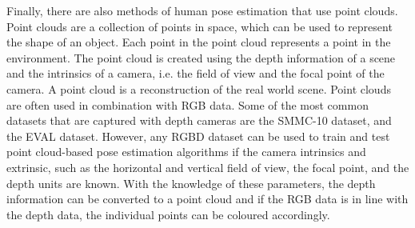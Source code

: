Finally, there are also methods of human pose estimation that use point clouds. Point clouds are a collection of points in space, which can be used to represent the shape of an object. Each point in the point cloud represents a point in the environment. The point cloud is created using the depth information of a scene and the intrinsics of a camera, i.e. the field of view and the focal point of the camera. A point cloud is a reconstruction of the real world scene. Point clouds are often used in combination with RGB data. Some of the most common datasets that are captured with depth cameras are the SMMC-10 dataset\cite{SMMC10}, and the EVAL dataset\cite{EVAL}. However, any RGBD dataset can be used to train and test point cloud-based pose estimation algorithms if the camera intrinsics and extrinsic, such as the horizontal and vertical field of view, the focal point, and the depth units are known. With the knowledge of these parameters, the depth information can be converted to a point cloud and if the RGB data is in line with the depth data, the individual points can be coloured accordingly.





